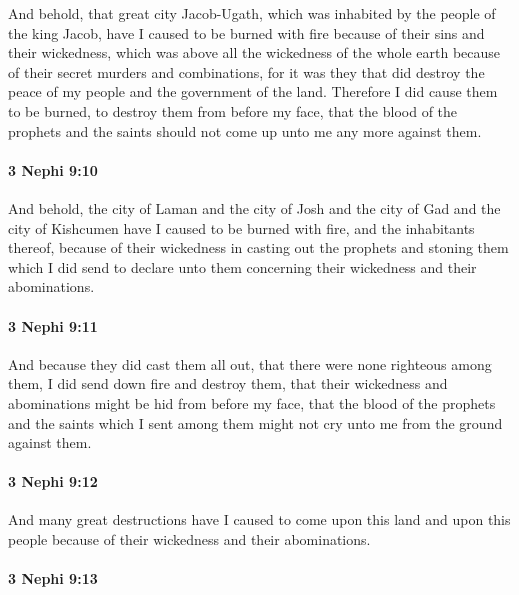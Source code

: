			And behold, that great city Jacob-Ugath,
			which was inhabited by the people of the king Jacob,
			have I caused to be burned with fire
			because of their sins and their wickedness,
			which was above all the wickedness of the whole earth
			because of their secret murders and combinations,
			for it was they that did destroy the peace of my people
			and the government of the land.
			Therefore I did cause them to be burned,
			to destroy them from before my face,
			that the blood of the prophets and the saints
			should not come up unto me any more against them.

		\paragraph{3 Nephi 9:10} %
			\label{3NEPHI-9-10}

			And behold, the city of Laman and the city of Josh
			and the city of Gad and the city of Kishcumen
			have I caused to be burned with fire,
			and the inhabitants thereof,
			because of their wickedness in casting out the prophets
			and stoning them which I did send to declare unto them
			concerning their wickedness and their abominations.

		\paragraph{3 Nephi 9:11} %
			\label{3NEPHI-9-11}

			And because they did cast them all out,
			that there were none righteous among them,
			I did send down fire and destroy them,
			that their wickedness and abominations might be hid from before my face,
			that the blood of the prophets and the saints which I sent among them
			might not cry unto me from the ground against them.

		\paragraph{3 Nephi 9:12} %
			\label{3NEPHI-9-12}

			And many great destructions have I caused
			to come upon this land and upon this people
			because of their wickedness and their abominations.

		\paragraph{3 Nephi 9:13} %
			\label{3NEPHI-9-13}

